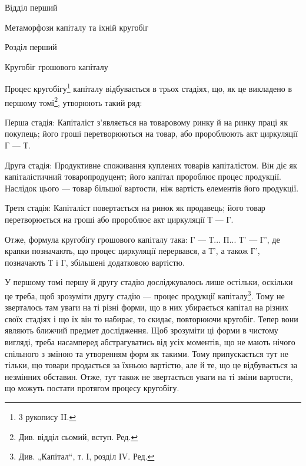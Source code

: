 Відділ перший

Метаморфози капіталу та їхній кругобіг

Розділ перший

Кругобіг грошового капіталу

Процес кругобігу\footnote{
3 рукопису II.
} капіталу відбувається в трьох стадіях, що, як
це викладено в першому томі\footnote*{
Див. відділ сьомий, вступ. Ред.
}, утворюють такий ряд:

Перша стадія: Капіталіст з’являється на товаровому ринку й на
ринку праці як покупець; його гроші перетворюються на товар, або пророблюють
акт циркуляції Г — Т.

Друга стадія: Продуктивне споживання куплених товарів капіталістом.
Він діє як капіталістичний товаропродуцент; його капітал пророблює
процес продукції. Наслідок цього — товар більшої вартости, ніж
вартість елементів його продукції.

Третя стадія: Капіталіст повертається на ринок як продавець; його
товар перетворюється на гроші або пророблює акт циркуляції Т — Г.

Отже, формула кругобігу грошового капіталу така: Г — Т... П... Т' —
Г', де крапки позначають, що процес циркуляції перервався, а Т', а
також Г', позначають Т і Г, збільшені додатковою вартістю.

У першому томі першу й другу стадію досліджувалось лише остільки,
оскільки це треба, щоб зрозуміти другу стадію — процес продукції капіталу\footnote*{
Див. „Капітал“, т. І, розділ IV. Ред.
}.
Тому не зверталось там уваги на ті різні форми, що в них убирається
капітал на різних своїх стадіях і що їх він то набирає, то скидає,
повторюючи кругобіг. Тепер вони являють ближчий предмет дослідження.
Щоб зрозуміти ці форми в чистому вигляді, треба насамперед абстрагуватись
від усіх моментів, що не мають нічого спільного з зміною та
утворенням форм як такими. Тому припускається тут не тільки, що товари
продається за їхньою вартістю, але й те, що це відбувається за
незмінних обставин. Отже, тут також не звертається уваги на ті зміни
вартости, що можуть постати протягом процесу кругобігу.